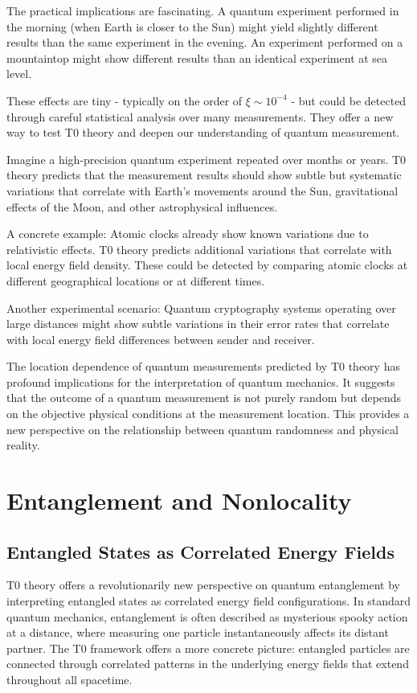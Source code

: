 \documentclass[12pt,a4paper]{article}
\newcommand{\xipar}{\xi}
\theoremstyle{definition}
\theoremstyle{remark}
\begin{document}
The practical implications are fascinating. A quantum experiment performed in the morning (when Earth is closer to the Sun) might yield slightly different results than the same experiment in the evening. An experiment performed on a mountaintop might show different results than an identical experiment at sea level.

These effects are tiny - typically on the order of $\xipar \sim 10^{-4}$ - but could be detected through careful statistical analysis over many measurements. They offer a new way to test T0 theory and deepen our understanding of quantum measurement.

Imagine a high-precision quantum experiment repeated over months or years. T0 theory predicts that the measurement results should show subtle but systematic variations that correlate with Earth's movements around the Sun, gravitational effects of the Moon, and other astrophysical influences.

A concrete example: Atomic clocks already show known variations due to relativistic effects. T0 theory predicts additional variations that correlate with local energy field density. These could be detected by comparing atomic clocks at different geographical locations or at different times.

Another experimental scenario: Quantum cryptography systems operating over large distances might show subtle variations in their error rates that correlate with local energy field differences between sender and receiver.

The location dependence of quantum measurements predicted by T0 theory has profound implications for the interpretation of quantum mechanics. It suggests that the outcome of a quantum measurement is not purely random but depends on the objective physical conditions at the measurement location. This provides a new perspective on the relationship between quantum randomness and physical reality.

\section{Entanglement and Nonlocality}

\subsection{Entangled States as Correlated Energy Fields}

T0 theory offers a revolutionarily new perspective on quantum entanglement by interpreting entangled states as correlated energy field configurations. In standard quantum mechanics, entanglement is often described as mysterious spooky action at a distance, where measuring one particle instantaneously affects its distant partner. The T0 framework offers a more concrete picture: entangled particles are connected through correlated patterns in the underlying energy fields that extend throughout all spacetime.
\end{document}
